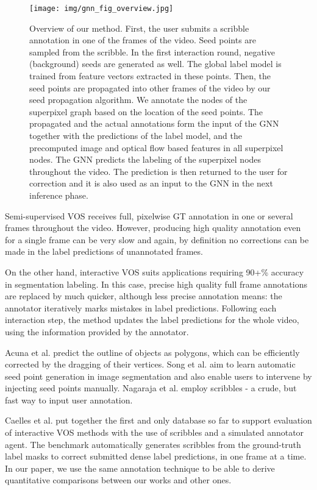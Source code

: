 \documentclass[conference]{IEEEtran}
\begin{document}
\begin{figure*}
    \centering 
    \texttt{[image: img/gnn\_fig\_overview.jpg]}
    \caption{Overview of our method. First, the user submits a scribble annotation in one of the frames of the video. Seed points are sampled from the scribble. In the first interaction round, negative (background) seeds are generated as well. The global label model is trained from feature vectors extracted in these points. Then, the seed points are propagated into other frames of the video by our seed propagation algorithm. We annotate the nodes of the superpixel graph based on the location of the seed points. The propagated and the actual annotations form the input of the GNN together with the predictions of the label model, and the precomputed image and optical flow based features in all superpixel nodes. The GNN predicts the labeling of the superpixel nodes throughout the video. The prediction is then returned to the user for correction and it is also used as an input to the GNN in the next inference phase.}
    \label{fig:overview}
\end{figure*}

Semi-supervised VOS receives full, pixelwise GT annotation in one or several frames throughout the video. However, producing high quality annotation even for a single frame can be very slow \cite{davis_challenge18} and again, by definition \cite{davis_challenge17, youtube_vos} no corrections can be made in the label predictions of unannotated frames.

On the other hand, interactive VOS suits applications requiring 90+\% accuracy in segmentation labeling. In this case, precise high quality full frame annotations are replaced by much quicker, although less precise annotation means: the annotator iteratively marks mistakes in label predictions. Following each interaction step, the method updates the label predictions for the whole video, using the information provided by the annotator.

Acuna et al. \cite{interactive_polygonrnn} predict the outline of objects as polygons, which can be efficiently corrected by the dragging of their vertices. Song et al. \cite{interactive_seednet} aim to learn automatic seed point generation in image segmentation and also enable users to intervene by injecting seed points manually. Nagaraja et al. \cite{interactive_nagaraja_iccv15} employ scribbles - a crude, but fast way to input user annotation.

Caelles et al. \cite{davis_challenge18} put together the first and only database so far to support evaluation of interactive VOS methods with the use of scribbles and a simulated annotator agent. The benchmark automatically generates scribbles from the ground-truth label masks to correct submitted dense label predictions, in one frame at a time. In our paper, we use the same annotation technique to be able to derive quantitative comparisons between our works and other ones.
\end{document}

